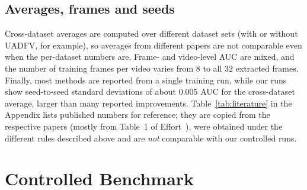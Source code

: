 \documentclass[fonts]{icst}
\begin{document}
\subsection{Averages, frames and seeds}
Cross-dataset averages are computed over different dataset sets (with or without UADFV, for example), so averages from different papers are not comparable even when the per-dataset numbers are. Frame- and video-level AUC are mixed, and the number of training frames per video varies from 8 to all 32 extracted frames. Finally, most methods are reported from a single training run, while our runs show seed-to-seed standard deviations of about 0.005 AUC for the cross-dataset average, larger than many reported improvements. Table~\ref{tab:literature} in the Appendix lists published numbers for reference; they are copied from the respective papers (mostly from Table~1 of Effort~\cite{yan2025effort}), were obtained under the different rules described above and are \emph{not} comparable with our controlled runs.



\section{Controlled Benchmark}
\label{sec:bench}
\end{document}
